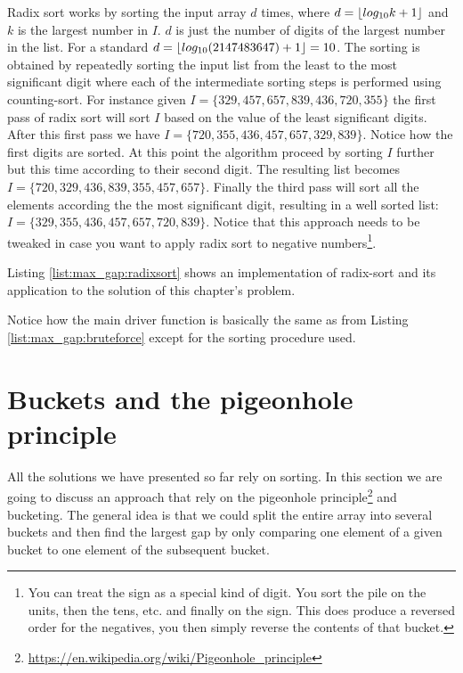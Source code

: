 Radix sort works by sorting the input array $d$ times, where $d = \lfloor log_{10}k+1\rfloor$ and $k$ is the largest number in $I$.
$d$ is just the number of digits of the largest number in the list. For a standard  $d=\lfloor log_{10}(2147483647) + 1\rfloor=10$.
The sorting is obtained by repeatedly sorting the input list from the least to the most significant digit where each of the intermediate 
sorting steps is performed using counting-sort.
For instance given $I = \{329,457,657,839,436,720,355\}$ the first pass of radix sort will sort $I$ based on the value of the least significant digits.
After this first pass we have $I=\{720,355,436,457,657,329,839\}$. Notice how the first digits are sorted. At this point the algorithm proceed by sorting 
$I$ further but this time according to their second digit. The resulting list becomes $I=\{720,329,436,839,355,457,657\}$.
Finally the third pass will sort all the elements according the the most significant digit, resulting in a well
sorted list: $I=\{329,355,436,457,657,720,839\}$. 
Notice that this approach needs to be tweaked in case you want to apply radix sort to negative numbers\footnote{You can treat the sign as a special kind of digit. 
You sort the pile on the units, then the tens, etc. and finally on the sign. 
This does produce a reversed order for the negatives, 
you then simply reverse the contents of that bucket.}.

Listing \ref{list:max_gap:radixsort} shows an implementation of radix-sort and its application to the solution of this chapter's problem.

Notice how the main driver function  is basically the same as  from Listing \ref{list:max_gap:bruteforce} except for the sorting procedure used.

\section{Buckets and the pigeonhole principle}
\label{max_gap:sec:buckets}
All the solutions we have presented so far rely on sorting. In this section we are going to discuss an approach
that rely on  the pigeonhole principle\footnote{\url{https://en.wikipedia.org/wiki/Pigeonhole_principle}} and bucketing.
The general idea is that we could split the entire array into several buckets and then find the largest gap by only comparing
one element of a given bucket to one element of the subsequent bucket. 

